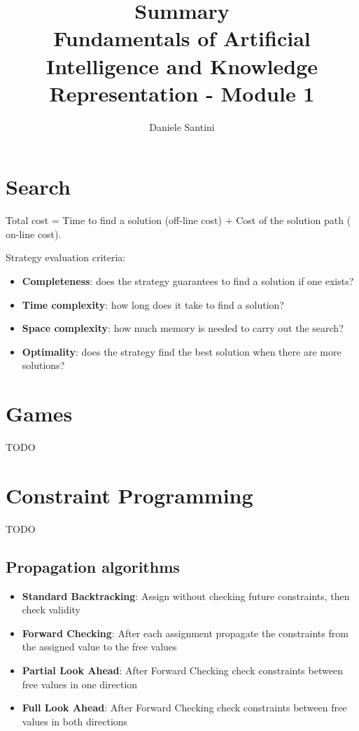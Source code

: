\documentclass[]{article}
\title{Summary \\ \large Fundamentals of Artificial Intelligence and Knowledge Representation - Module 1}
\author{Daniele Santini}
\begin{document}

\section{Search}

Total cost = Time to find a solution (off-line cost) + Cost of the solution path (
on-line cost).

Strategy evaluation criteria:
\begin{itemize}
	\item \textbf{Completeness}: does the strategy guarantees to find a solution if one exists?
	\item \textbf{Time complexity}: how long does it take to find a solution?
	\item \textbf{Space complexity}: how much memory is needed to carry out the search?
	\item \textbf{Optimality}: does the strategy find the best solution when there are more solutions?
\end{itemize}

\section{Games}

TODO

\section{Constraint Programming}

TODO

\subsection{Propagation algorithms}

\begin{itemize}
	\item \textbf{Standard Backtracking}: Assign without checking future constraints, then check validity
	\item \textbf{Forward Checking}: After each assignment propagate the constraints from the assigned value to the free values
	\item \textbf{Partial Look Ahead}: After Forward Checking check constraints between free values in one direction
	\item \textbf{Full Look Ahead}: After Forward Checking check constraints between free values in both directions
\end{itemize}
\end{document}
